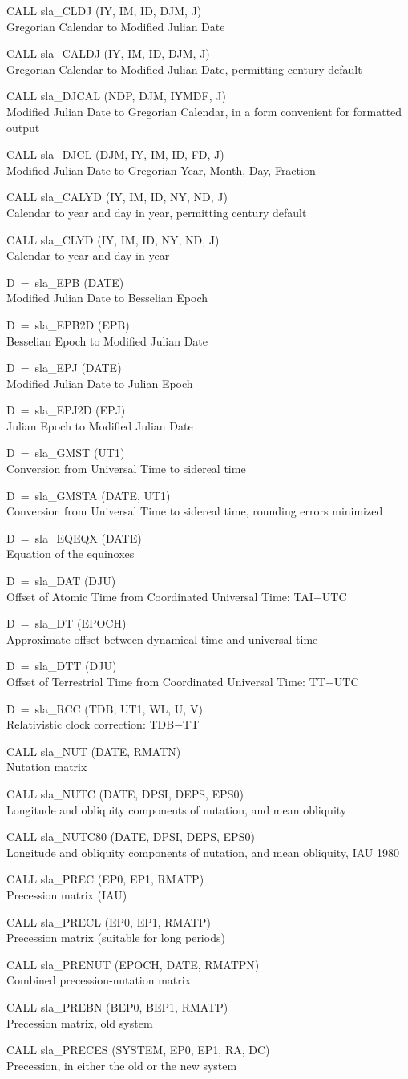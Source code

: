 \documentclass[11pt,twoside]{article}
\newcommand{\callhead}[1]{\goodbreak\vspace{\bigskipamount}{\large\bf{#1}}}
\newenvironment{callset}{\begin{list}{}{\setlength{\leftmargin}{2cm}
                             \setlength{\parsep}{\smallskipamount}}}{\end{list}}
\newcommand{\subp}[1]{\item\hspace{-1cm}#1\\}
\begin{document}
\callhead{Calendars}
\begin{callset}
\subp{CALL sla\_CLDJ (IY, IM, ID, DJM, J)}
   Gregorian Calendar to Modified Julian Date
\subp{CALL sla\_CALDJ (IY, IM, ID, DJM, J)}
   Gregorian Calendar to Modified Julian Date,
     permitting century default
\subp{CALL sla\_DJCAL (NDP, DJM, IYMDF, J)}
   Modified Julian Date to Gregorian Calendar,
     in a form convenient for formatted output
\subp{CALL sla\_DJCL (DJM, IY, IM, ID, FD, J)}
   Modified Julian Date to Gregorian Year, Month, Day, Fraction
\subp{CALL sla\_CALYD (IY, IM, ID, NY, ND, J)}
   Calendar to year and day in year, permitting century default
\subp{CALL sla\_CLYD (IY, IM, ID, NY, ND, J)}
   Calendar to year and day in year
\subp{D~=~sla\_EPB (DATE)}
   Modified Julian Date to Besselian Epoch
\subp{D~=~sla\_EPB2D (EPB)}
   Besselian Epoch to Modified Julian Date
\subp{D~=~sla\_EPJ (DATE)}
   Modified Julian Date to Julian Epoch
\subp{D~=~sla\_EPJ2D (EPJ)}
   Julian Epoch to Modified Julian Date
\end{callset}

\callhead{Time Scales}
\begin{callset}
\subp{D~=~sla\_GMST (UT1)}
   Conversion from Universal Time to sidereal time
\subp{D~=~sla\_GMSTA (DATE, UT1)}
   Conversion from Universal Time to sidereal time, rounding errors minimized
\subp{D~=~sla\_EQEQX (DATE)}
   Equation of the equinoxes
\subp{D~=~sla\_DAT (DJU)}
   Offset of Atomic Time from Coordinated Universal Time: TAI$-$UTC
\subp{D~=~sla\_DT (EPOCH)}
   Approximate offset between dynamical time and universal time
\subp{D~=~sla\_DTT (DJU)}
   Offset of Terrestrial Time from Coordinated Universal Time: TT$-$UTC
\subp{D~=~sla\_RCC (TDB, UT1, WL, U, V)}
   Relativistic clock correction: TDB$-$TT
\end{callset}

\callhead{Precession and Nutation}
\begin{callset}
\subp{CALL sla\_NUT (DATE, RMATN)}
   Nutation matrix
\subp{CALL sla\_NUTC (DATE, DPSI, DEPS, EPS0)}
   Longitude and obliquity components of nutation, and
     mean obliquity
\subp{CALL sla\_NUTC80 (DATE, DPSI, DEPS, EPS0)}
   Longitude and obliquity components of nutation, and
     mean obliquity, IAU 1980
\subp{CALL sla\_PREC (EP0, EP1, RMATP)}
   Precession matrix (IAU)
\subp{CALL sla\_PRECL (EP0, EP1, RMATP)}
   Precession matrix (suitable for long periods)
\subp{CALL sla\_PRENUT (EPOCH, DATE, RMATPN)}
   Combined precession-nutation matrix
\subp{CALL sla\_PREBN (BEP0, BEP1, RMATP)}
   Precession matrix, old system
\subp{CALL sla\_PRECES (SYSTEM, EP0, EP1, RA, DC)}
   Precession, in either the old or the new system
\end{callset}
\end{document}
